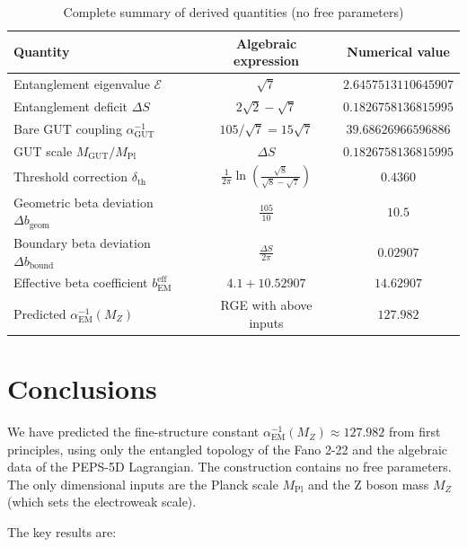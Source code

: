 \documentclass[12pt]{article}
\begin{document}
\begin{table}[h]
\centering
\caption{Complete summary of derived quantities (no free parameters)}
\label{tab:summary}
\begin{tabular}{lcc}
\toprule
\textbf{Quantity} & \textbf{Algebraic expression} & \textbf{Numerical value} \\
\midrule
Entanglement eigenvalue \(\mathcal{E}\) & \(\sqrt{7}\) & \(2.6457513110645907\) \\
Entanglement deficit \(\Delta S\) & \(2\sqrt{2} - \sqrt{7}\) & \(0.1826758136815995\) \\
Bare GUT coupling \(\alpha_{\text{GUT}}^{-1}\) & \(105 / \sqrt{7} = 15\sqrt{7}\) & \(39.68626966596886\) \\
GUT scale \(M_{\text{GUT}} / M_{\text{Pl}}\) & \(\Delta S\) & \(0.1826758136815995\) \\
Threshold correction \(\delta_{\text{th}}\) & \(\frac{1}{2\pi}\ln\left(\frac{\sqrt{8}}{\sqrt{8} - \sqrt{7}}\right)\) & \(0.4360\) \\
Geometric beta deviation \(\Delta b_{\text{geom}}\) & \(\frac{105}{10}\) & \(10.5\) \\
Boundary beta deviation \(\Delta b_{\text{bound}}\) & \(\frac{\Delta S}{2\pi}\) & \(0.02907\) \\
Effective beta coefficient \(b_{\text{EM}}^{\text{eff}}\) & \(4.1 + 10.52907\) & \(14.62907\) \\
Predicted \(\alpha_{\text{EM}}^{-1}(M_Z)\) & RGE with above inputs & \(127.982\) \\
\hline
\end{tabular}
\end{table}

\section{Conclusions}

We have predicted the fine-structure constant \(\alpha_{\text{EM}}^{-1}(M_Z) \approx 127.982\) from first principles, using only the entangled topology of the Fano 2-22 and the algebraic data of the PEPS-5D Lagrangian. The construction contains no free parameters. The only dimensional inputs are the Planck scale \(M_{\text{Pl}}\) and the Z boson mass \(M_Z\) (which sets the electroweak scale).

The key results are:
\end{document}
